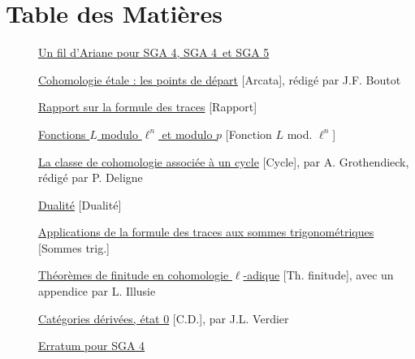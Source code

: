 \chapter*{Table des Matières}
\label{OriginalContents}
\begin{description}
\item[] \hyperref[Ariane]{Un fil d'Ariane pour SGA 4, SGA 4\textonehalf\ et SGA 5}
\item[] \hyperref[I]{Cohomologie étale : les points de départ} [Arcata], rédigé par J.F. Boutot
\item[] \hyperref[II]{Rapport sur la formule des traces} [Rapport]
\item[] \hyperref[III]{Fonctions $L$ modulo $\ell^n$ et modulo $p$} [Fonction $L$ mod. $\ell^n$]
\item[] \hyperref[IV]{La classe de cohomologie associée à un cycle} [Cycle], par A. Grothendieck, rédigé par P. Deligne
\item[] \hyperref[V]{Dualité} [Dualité]
\item[] \hyperref[VI]{Applications de la formule des traces aux sommes trigonométriques} [Sommes trig.]
\item[] \hyperref[VII]{Théorèmes de finitude en cohomologie $\ell$-adique} [Th. finitude], avec un appendice par L. Illusie
\item[] \hyperref[VIII]{Catégories dérivées, état 0} [C.D.], par J.L. Verdier
\item[] \hyperref[ErratumSGA4]{Erratum pour SGA 4}
\end{description}
\clearpage
